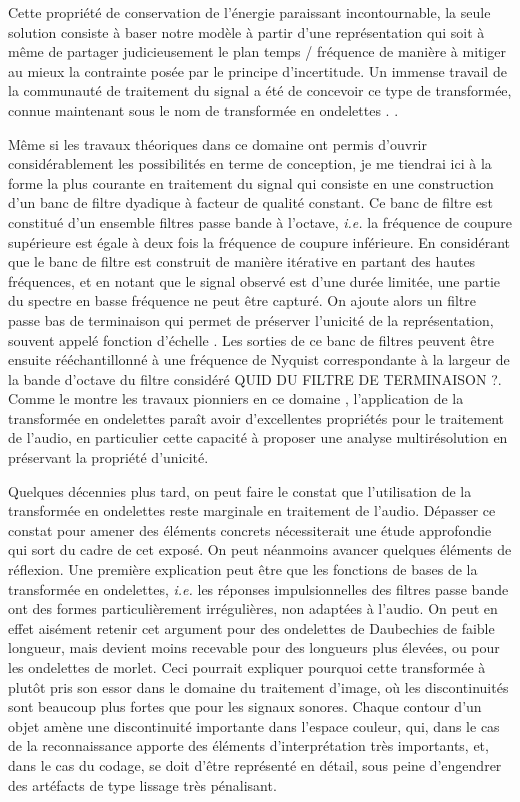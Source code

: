 Cette propriété de conservation de l'énergie paraissant incontournable, la seule solution consiste à baser notre modèle à partir d'une représentation qui soit à même de partager judicieusement le plan temps / fréquence de manière à mitiger au mieux la contrainte posée par le principe d'incertitude. Un immense travail de la communauté de traitement du signal a été de concevoir ce type de transformée, connue maintenant sous le nom de transformée en \og ondelettes \fg. \cite{mallat1989theory}.

Même si les travaux théoriques dans ce domaine ont permis d'ouvrir considérablement les possibilités en terme de conception, je me  tiendrai ici à la forme la plus courante en traitement du signal qui consiste en une construction d'un banc de filtre dyadique à facteur de qualité constant. Ce banc de filtre est constitué d'un ensemble filtres passe bande à l'octave, \textit{i.e.} la fréquence de coupure supérieure est égale à deux fois la fréquence de coupure inférieure. En considérant que le banc de filtre est construit de manière itérative en partant des hautes fréquences, et en notant que le signal observé est d'une durée limitée, une partie du spectre en basse fréquence ne peut être capturé. On ajoute alors un filtre passe bas \og de terminaison \fg qui permet de préserver l'unicité de la représentation, souvent appelé \og fonction d'échelle \fg. Les sorties de ce banc de filtres peuvent être ensuite rééchantillonné à une fréquence de Nyquist correspondante à la largeur de la bande d'octave du filtre considéré QUID DU FILTRE DE TERMINAISON ?. Comme le montre les travaux pionniers en ce domaine \cite{kronland1987analysis}, l'application de la transformée en ondelettes paraît avoir d'excellentes propriétés pour le traitement de l'audio, en particulier cette capacité à proposer une analyse multirésolution en préservant la propriété d'unicité.

Quelques décennies plus tard, on peut faire le constat que l'utilisation de la transformée en ondelettes reste marginale en traitement de l'audio. Dépasser ce constat pour amener des éléments concrets nécessiterait une étude approfondie qui sort du cadre de cet exposé. On peut néanmoins avancer quelques éléments de réflexion. Une première explication peut être que les fonctions de bases de la transformée en ondelettes, \textit{i.e.} les réponses impulsionnelles des filtres passe bande ont des formes particulièrement irrégulières, non adaptées à l'audio. On peut en effet aisément retenir cet argument pour des ondelettes de Daubechies de faible longueur, mais devient moins recevable pour des longueurs plus élevées, ou pour les ondelettes de morlet. Ceci pourrait expliquer pourquoi cette transformée à plutôt pris son essor dans le domaine du traitement d'image, où les discontinuités sont beaucoup plus fortes que pour les signaux sonores. Chaque contour d'un objet amène une discontinuité importante dans l'espace couleur, qui, dans le cas de la reconnaissance apporte des éléments d'interprétation très importants, et, dans le cas du codage, se doit d'être représenté en détail, sous peine d'engendrer des artéfacts de type \og lissage \fg très pénalisant.

